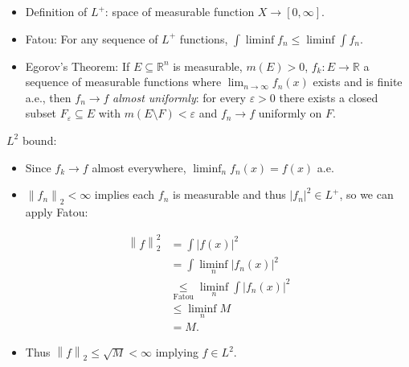 \begin{solution}

\hfill

\begin{concept}

\hfill

\begin{itemize}
\tightlist
\item
  Definition of \(L^+\): space of measurable function
  \(X\to [0, \infty]\).
\item
  Fatou: For any sequence of \(L^+\) functions,
  \(\int \liminf f_n \leq \liminf \int f_n\).
\item
  Egorov's Theorem: If \(E\subseteq {\mathbb{R}}^n\) is measurable,
  \(m(E) > 0\), \(f_k:E\to {\mathbb{R}}\) a sequence of measurable
  functions where \(\lim_{n\to\infty} f_n(x)\) exists and is finite
  a.e., then \(f_n\to f\) \emph{almost uniformly}: for every
  \({\varepsilon}>0\) there exists a closed subset
  \(F_{\varepsilon}\subseteq E\) with
  \(m(E\setminus F) < {\varepsilon}\) and \(f_n\to f\) uniformly on
  \(F\).
\end{itemize}

\end{concept}

\(L^2\) bound:

\begin{itemize}
\tightlist
\item
  Since \(f_k \to f\) almost everywhere, \(\liminf_n f_n(x) = f(x)\)
  a.e.
\item
  \({\left\lVert {f_n} \right\rVert}_2 < \infty\) implies each \(f_n\)
  is measurable and thus \({\left\lvert {f_n} \right\rvert}^2 \in L^+\),
  so we can apply Fatou:
\end{itemize}

\begin{align*}
{\left\lVert {f} \right\rVert}_2^2
&= \int {\left\lvert {f(x)} \right\rvert}^2  \\
&= \int \liminf_n {\left\lvert {f_n(x)} \right\rvert}^2 \\
&\underset{\text{Fatou}}\leq\liminf_n \int {\left\lvert {f_n(x)} \right\rvert}^2 \\
&\leq \liminf_n M \\
&= M
.\end{align*}

\begin{itemize}
\tightlist
\item
  Thus \({\left\lVert {f} \right\rVert}_2 \leq \sqrt{M} < \infty\)
  implying \(f\in L^2\).
\end{itemize}


\end{solution}
